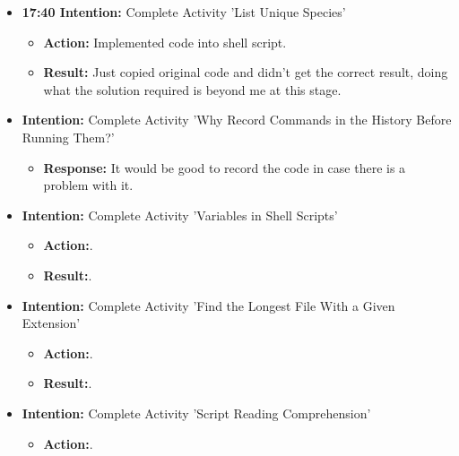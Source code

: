 \documentclass{article}
\begin{document}
\begin{itemize}

\item{\textbf{ 17:40 Intention:} Complete Activity 'List Unique Species'}

\begin{itemize}
\item{\textbf{Action:} Implemented code into shell script.}

\item{\textbf{Result:} Just copied original code and didn't get the correct result, doing what the solution required is beyond me at this stage.}

\end{itemize}

\item{\textbf{Intention:} Complete Activity 'Why Record Commands in the History Before Running Them?'}

\begin{itemize}
\item{\textbf{Response:} It would be good to record the code in case there is a problem with it.}


\end{itemize}


\item{\textbf{Intention:} Complete Activity 'Variables in Shell Scripts'}

\begin{itemize}
\item{\textbf{Action:}.}

\item{\textbf{Result:}.}

\end{itemize}


\item{\textbf{Intention:} Complete Activity 'Find the Longest File With a Given Extension'}

\begin{itemize}
\item{\textbf{Action:}.}

\item{\textbf{Result:}.}

\end{itemize}

\item{\textbf{Intention:} Complete Activity 'Script Reading Comprehension'}

\begin{itemize}
\item{\textbf{Action:}.}


\end{itemize}
\end{itemize}
\end{document}

